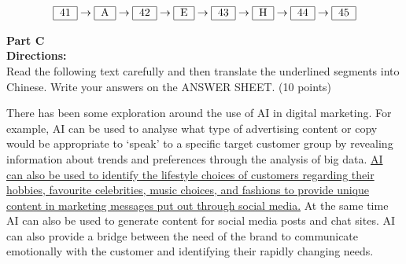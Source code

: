 \[ 
\begin{tabular}{|c|}
	\hline
	41 \\
	\hline
\end{tabular}
\rightarrow
\begin{tabular}{|c|}
	\hline
	A \\
	\hline
\end{tabular}
\rightarrow
\begin{tabular}{|c|}
	\hline
	42 \\
	\hline
\end{tabular}
\rightarrow
\begin{tabular}{|c|}
	\hline
	E \\
	\hline
\end{tabular}
\rightarrow
\begin{tabular}{|c|}
	\hline
	43 \\
	\hline
\end{tabular}
\rightarrow
\begin{tabular}{|c|}
	\hline
	H \\
	\hline
\end{tabular}
\rightarrow
\begin{tabular}{|c|}
	\hline
	44 \\
	\hline
\end{tabular}
\rightarrow
\begin{tabular}{|c|}
	\hline
	45 \\
	\hline
\end{tabular}
\]

\phantom{ \linefill \linefill \linefill \linefill \linefill}


\noindent
\textbf{Part C}\\
\textbf{Directions:}\\
Read the following text carefully and then translate the underlined segments into Chinese. Write your answers on the ANSWER SHEET. (10 points)

\TiGanSpace

There has been some exploration around the use of AI in digital marketing. For example, AI can be used to analyse what type of advertising content or copy would be appropriate to ‘speak’ to a specific target customer group by revealing information about trends and preferences through the analysis of big data. \transnum  \uline{ AI can also be used to identify the lifestyle choices of customers regarding their hobbies, favourite celebrities, music choices, and fashions to provide unique content in marketing messages put out through social media.} At the same time AI can also be used to generate content for social media posts and chat sites. AI can also provide a bridge between the need of the brand to communicate emotionally with the customer and identifying their rapidly changing needs.

